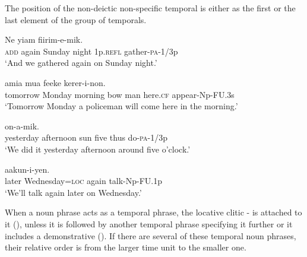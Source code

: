 The position of the non-deictic non-specific temporal is either as the first or the last element of the group of temporals.

\ea%
\label{ex:x874}
\gll Ne      yiam  fiirim-e-mik. \\
\textsc{add}  again  Sunday  night  1p.\textsc{refl}  gather-\textsc{pa}-1/3p      \\
\glt`And we gathered again on Sunday night.'
\z





\ea%
\label{ex:x875}
\gll {}     amia  mua  feeke  kerer-i-non. \\
 tomorrow  Monday  morning  bow  man  here.\textsc{cf}  appear-Np-FU.3s     \\
\glt`Tomorrow Monday a policeman will come here in the morning.'
\z





\ea%
\label{ex:x877}
\gll {}      on-a-mik. \\
  yesterday  afternoon  sun  five  thus  do-\textsc{pa}-1/3p    \\
\glt`We did it yesterday afternoon around five o'clock.'
\z





\ea%
\label{ex:x876}
\gll {}    aakun-i-yen. \\
  later  Wednesday=\textsc{loc}  again  talk-Np-FU.1p    \\
\glt`We'll talk again later on Wednesday.'
\z





When a noun phrase acts as a temporal phrase, the locative clitic - is attached to it (), unless it is followed by another temporal phrase specifying it further or it includes a demonstrative (). If there are several of these temporal noun phrases, their relative order is from the larger time unit to the smaller one. 

